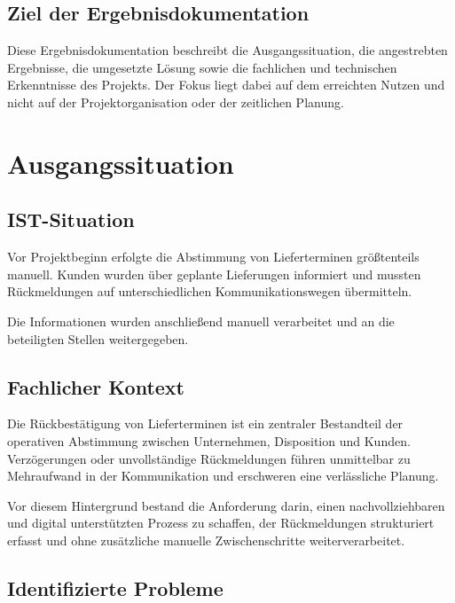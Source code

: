\documentclass[
12pt,
a4paper
]{article}
\begin{document}
\subsection{Ziel der Ergebnisdokumentation}

Diese Ergebnisdokumentation beschreibt die Ausgangssituation,
die angestrebten Ergebnisse, die umgesetzte Lösung sowie die
fachlichen und technischen Erkenntnisse des Projekts. Der Fokus
liegt dabei auf dem erreichten Nutzen und nicht auf der
Projektorganisation oder der zeitlichen Planung.

\section{Ausgangssituation}

\subsection{IST-Situation}

Vor Projektbeginn erfolgte die Abstimmung von Lieferterminen
größtenteils manuell. Kunden wurden über geplante Lieferungen
informiert und mussten Rückmeldungen auf unterschiedlichen
Kommunikationswegen übermitteln.

Die Informationen wurden anschließend manuell verarbeitet und
an die beteiligten Stellen weitergegeben.

\subsection{Fachlicher Kontext}

Die Rückbestätigung von Lieferterminen ist ein zentraler
Bestandteil der operativen Abstimmung zwischen Unternehmen,
Disposition und Kunden. Verzögerungen oder unvollständige
Rückmeldungen führen unmittelbar zu Mehraufwand in der
Kommunikation und erschweren eine verlässliche Planung.

Vor diesem Hintergrund bestand die Anforderung darin, einen
nachvollziehbaren und digital unterstützten Prozess zu schaffen,
der Rückmeldungen strukturiert erfasst und ohne zusätzliche
manuelle Zwischenschritte weiterverarbeitet.

\subsection{Identifizierte Probleme}
\end{document}

